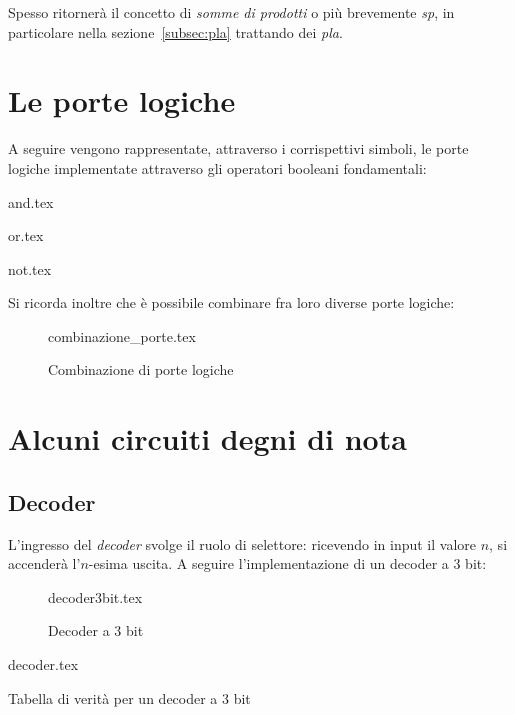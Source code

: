 \documentclass[class=book, crop=false, oneside]{standalone}
\begin{document}
Spesso ritornerà il concetto di \emph{somme di prodotti} o più brevemente \emph{sp}, in particolare nella sezione~\ref{subsec:pla} trattando dei \emph{pla}.

\section{Le porte logiche}
A seguire vengono rappresentate, attraverso i corrispettivi simboli, le porte logiche implementate attraverso gli operatori booleani fondamentali:
\vspace{10px}

\begin{minipage}[c]{.3\textwidth}
	\centering
	{and.tex}
\end{minipage}
\begin{minipage}[c]{.3\textwidth}
	\centering
	{or.tex}
\end{minipage}
\begin{minipage}[c]{.3\textwidth}
	\centering
	{not.tex}
\end{minipage}

\vspace{10px}

Si ricorda inoltre che è possibile combinare fra loro diverse porte logiche:
\begin{figure}[H]
	\centering
	{combinazione_porte.tex}
	\caption{Combinazione di porte logiche}
\end{figure}

\section{Alcuni circuiti degni di nota}
\subsection*{Decoder}
L'ingresso del \emph{decoder} svolge il ruolo di selettore: ricevendo in input il valore \(n\), si accenderà l'\(n\)-esima uscita. A seguire l'implementazione di un decoder a 3 bit:
\begin{figure}[H]
	\centering
	{decoder3bit.tex}
	\caption{Decoder a 3 bit}
\end{figure}
\begin{table}[!h]
	\centering
	{decoder.tex}
	\caption{Tabella di verità per un decoder a 3 bit}
	\label{decoder-3bit}
\end{table}
\end{document}
